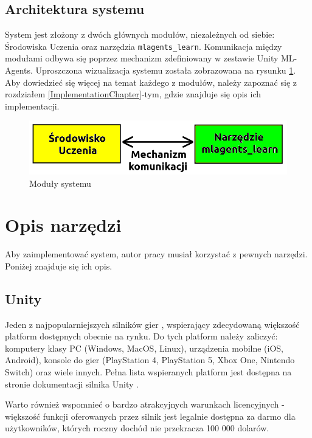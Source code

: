 \subsection{Architektura systemu}
\label{SoftwareArchSection}
System jest złożony z dwóch głównych modułów, niezależnych od siebie: Środowiska Uczenia oraz narzędzia \texttt{mlagents\_learn}. Komunikacja między modułami odbywa się poprzez mechanizm zdefiniowany w zestawie Unity ML-Agents. Uproszczona wizualizacja systemu została zobrazowana na rysunku \ref{SystemArchitecture}. Aby dowiedzieć się więcej na temat każdego z modułów, należy zapoznać się z rozdziałem \ref{ImplementationChapter}-tym, gdzie znajduje się opis ich implementacji. \\

\begin{figure}[h]
\begin{center}
\includegraphics[width=15cm]{resources/figures/system_architecture.png}
\caption{Moduły systemu}
\label{SystemArchitecture}
\end{center}
\end{figure}

\section{Opis narzędzi}
Aby zaimplementować system, autor pracy musiał korzystać z pewnych narzędzi. \\
Poniżej znajduje się ich opis.

\subsection{Unity}
Jeden z najpopularniejszych silników gier \cite{unity:opis}, wspierający zdecydowaną większość platform dostępnych obecnie na rynku. Do tych platform należy zaliczyć: komputery klasy PC (Windows, MacOS, Linux), urządzenia mobilne (iOS, Android), konsole do gier (PlayStation 4, PlayStation 5, Xbox One, Nintendo Switch) oraz wiele innych. Pełna lista wspieranych platform jest dostępna na stronie dokumentacji silnika Unity \cite{unity:buildTargets}.

Warto również wspomnieć o bardzo atrakcyjnych warunkach licencyjnych - większość funkcji oferowanych przez silnik jest legalnie dostępna za darmo dla użytkowników, których roczny dochód nie przekracza 100 000 dolarów.

